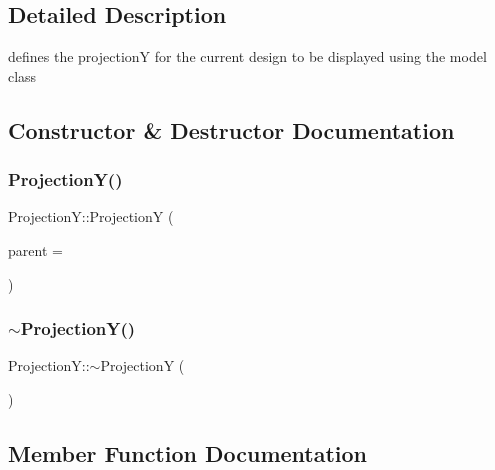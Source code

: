 \subsection{Detailed Description}
defines the projectionY for the current design to be displayed using the model class 

\subsection{Constructor \& Destructor Documentation}
\mbox{\label{class_projection_y_ada83942857907322b5bad855f34ee893}} 
\subsubsection{\texorpdfstring{Projection\+Y()}{ProjectionY()}}
{\footnotesize\ttfamily Projection\+Y\+::\+ProjectionY (\begin{DoxyParamCaption}\item[{Q\+Widget $\ast$}]{parent = {} }\end{DoxyParamCaption})\hspace{0.3cm}{\ttfamily [explicit]}}

\mbox{\label{class_projection_y_ae04caa820022f1802188835dbc69cf32}} 
\subsubsection{\texorpdfstring{$\sim$\+Projection\+Y()}{~ProjectionY()}}
{\footnotesize\ttfamily Projection\+Y\+::$\sim$\+ProjectionY (\begin{DoxyParamCaption}{ }\end{DoxyParamCaption})}



\subsection{Member Function Documentation}
\mbox{\label{class_projection_y_aa241c90c6d57dedc345ce447de8b2062}} 
